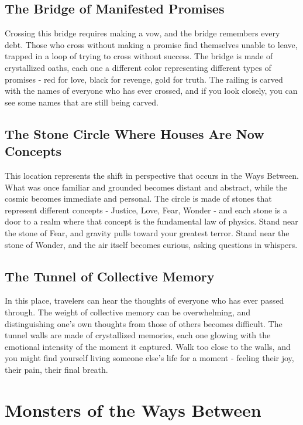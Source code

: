 \documentclass[11pt]{article}
\begin{document}
\subsection{The Bridge of Manifested Promises}

Crossing this bridge requires making a vow, and the bridge remembers every debt. Those who cross without making a promise find themselves unable to leave, trapped in a loop of trying to cross without success. The bridge is made of crystallized oaths, each one a different color representing different types of promises - red for love, black for revenge, gold for truth. The railing is carved with the names of everyone who has ever crossed, and if you look closely, you can see some names that are still being carved.

\subsection{The Stone Circle Where Houses Are Now Concepts}

This location represents the shift in perspective that occurs in the Ways Between. What was once familiar and grounded becomes distant and abstract, while the cosmic becomes immediate and personal. The circle is made of stones that represent different concepts - Justice, Love, Fear, Wonder - and each stone is a door to a realm where that concept is the fundamental law of physics. Stand near the stone of Fear, and gravity pulls toward your greatest terror. Stand near the stone of Wonder, and the air itself becomes curious, asking questions in whispers.

\subsection{The Tunnel of Collective Memory}

In this place, travelers can hear the thoughts of everyone who has ever passed through. The weight of collective memory can be overwhelming, and distinguishing one's own thoughts from those of others becomes difficult. The tunnel walls are made of crystallized memories, each one glowing with the emotional intensity of the moment it captured. Walk too close to the walls, and you might find yourself living someone else's life for a moment - feeling their joy, their pain, their final breath.

\section{Monsters of the Ways Between}
\end{document}
